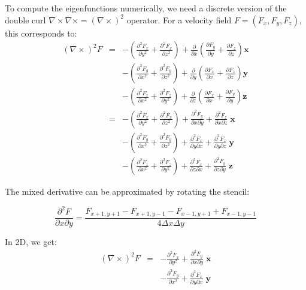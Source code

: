 \documentclass[12pt,onecolumn]{article}
\begin{document}
To compute the eigenfunctions numerically, we need a discrete version of the double curl $\nabla \times \nabla \times = (\nabla \times)^2$ operator. For a velocity field $F = (F_x, F_y, F_z)$, this corresponds to:
\begin{eqnarray*}
(\nabla \times)^2 F 
&=&-\left(\frac{\partial^2 F_x}{\partial y^2} + \frac{\partial^2 F_x}{\partial z^2}\right) + \frac{\partial}{\partial x}\left(\frac{\partial F_y}{\partial y} + \frac{\partial F_z}{\partial z}\right) \mathbf{x} \\
&&  -\left(\frac{\partial^2 F_y}{\partial x^2} + \frac{\partial^2 F_y}{\partial z^2}\right) + \frac{\partial}{\partial y}\left(\frac{\partial F_x}{\partial x} + \frac{\partial F_z}{\partial z}\right) \mathbf{y} \\
&&  -\left(\frac{\partial^2 F_z}{\partial x^2} + \frac{\partial^2 F_z}{\partial y^2}\right) + \frac{\partial}{\partial z}\left(\frac{\partial F_x}{\partial x} + \frac{\partial F_y}{\partial y}\right) \mathbf{z} \\
&=&-\left(\frac{\partial^2 F_x}{\partial y^2} + \frac{\partial^2 F_x}{\partial z^2}\right) + \frac{\partial^2 F_y}{\partial x \partial y} + \frac{\partial^2 F_z}{\partial x \partial z} \; \mathbf{x} \\
&&  -\left(\frac{\partial^2 F_y}{\partial x^2} + \frac{\partial^2 F_y}{\partial z^2}\right) + \frac{\partial^2 F_x}{\partial y \partial x} + \frac{\partial^2 F_z}{\partial y \partial z} \; \mathbf{y} \\
&&  -\left(\frac{\partial^2 F_z}{\partial x^2} + \frac{\partial^2 F_z}{\partial y^2}\right) + \frac{\partial^2 F_x}{\partial z \partial x} + \frac{\partial^2 F_y}{\partial z \partial y} \; \mathbf{z}
\end{eqnarray*}

The mixed derivative can be approximated by rotating the stencil:

\begin{equation}
\frac{\partial^2 F}{\partial x\partial y} = \frac{F_{x + 1,y + 1} - F_{x + 1,y - 1} - F_{x - 1,y + 1} + F_{x - 1,y - 1}}{4 \Delta x \Delta y}
\end{equation}

In 2D, we get:
\begin{eqnarray*}
(\nabla \times)^2 F 
&=&-\frac{\partial^2 F_x}{\partial y^2} + \frac{\partial^2 F_y}{\partial x \partial y} \; \mathbf{x} \\
&&  -\frac{\partial^2 F_y}{\partial x^2} + \frac{\partial^2 F_x}{\partial y \partial x} \; \mathbf{y}
\end{eqnarray*}
\end{document}
